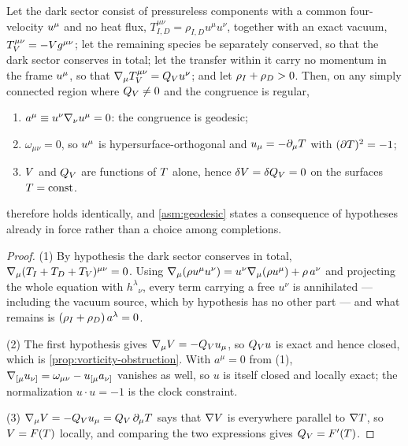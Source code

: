 \begin{proposition}
  \label{prop:geodesic-forced}
  Let the dark sector consist of pressureless components with a common
  four-velocity $u^{\mu}$ and no heat flux, $T^{\mu\nu}_{I,D}=\rho_{I,D}u^\mu
  u^\nu$, together with an exact vacuum, $T^{\mu\nu}_V=-V g^{\mu\nu}$; let
  the remaining species be separately conserved, so that the dark sector
  conserves in total; let the transfer within it carry no momentum in the frame
  $u^{\mu}$, so that $\nabla_\mu T^{\mu\nu}_V=Q_{V} u^\nu$; and let $\rho_{I}+\rho_{D}>0$.
  Then, on any simply connected region where $Q_{V}\neq0$ and the congruence is
  regular,
  \begin{enumerate}
    \item $a^\mu \equiv u^\nu\nabla_\nu u^\mu=0$: the congruence is geodesic;
    \item $\omega_{\mu\nu}=0$, so $u^{\mu}$ is hypersurface-orthogonal and
      $u_\mu=-\partial_\mu T$ with $(\partial T)^2=-1$;
    \item $V$ and $Q_{V}$ are functions of $T$ alone, hence
      $\delta V=\delta Q_{V}=0$ on the surfaces $T=\text{const}$.
  \end{enumerate}
   therefore holds identically, and
  \cref{asm:geodesic} states a consequence of hypotheses already in force
  rather than a choice among completions.
\end{proposition}

\begin{proof}
  (1) By hypothesis the dark sector conserves in total,
  $\nabla_\mu(T_I+T_D+T_V)^{\mu\nu}=0$. Using
  $\nabla_\mu(\rho u^\mu u^\nu)=u^\nu\nabla_\mu(\rho u^\mu)+\rho\,a^\nu$ and
  projecting the whole equation with $h^\lambda{}_\nu$, every term carrying a
  free $u^\nu$ is annihilated --- including the vacuum source, which by
  hypothesis has no other part --- and what remains is
  $(\rho_{I}+\rho_{D})\,a^\lambda=0$.

  (2) The first hypothesis gives $\nabla_\mu V=-Q_{V} u_\mu$, so $Q_{V} u$ is
  exact and hence closed, which is \cref{prop:vorticity-obstruction}. With
  $a^\mu=0$ from (1), $\nabla_{[\mu}u_{\nu]}=\omega_{\mu\nu}-u_{[\mu}a_{\nu]}$
  vanishes as well, so $u$ is itself closed and locally exact; the
  normalization $u\cdot u=-1$ is the clock constraint.

  (3) $\nabla_\mu V=-Q_{V} u_\mu=Q_{V}\,\partial_\mu T$ says that
  $\nabla V$ is everywhere parallel to $\nabla T$, so $V=F(T)$
  locally, and comparing the two expressions gives $Q_{V}=F'(T)$.
\end{proof}

